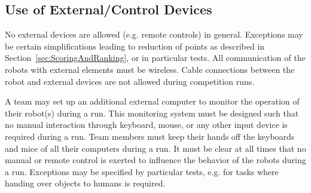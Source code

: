 \subsection{Use of External/Control Devices}
No external devices are allowed (e.g. remote controls) in general. Exceptions may be certain simplifications leading to reduction of points as described in Section~\ref{sec:ScoringAndRanking}, or in particular tests. All communication of the robots with external elements must be wireless. Cable connections between the robot and external devices are not allowed during competition runs.
\par
A team may set up an additional external computer to monitor the operation of their robot(s) during a run. This monitoring system must be designed such that no manual interaction through keyboard, mouse, or any other input device is required during a run. Team members must keep their hands off the keyboards and mice of all their computers during a run.
It must be clear at all times that no manual or remote control is exerted to influence the behavior of the robots during a run. Exceptions may be specified by particular tests, e.g. for tasks where handing over objects to humans is required.

